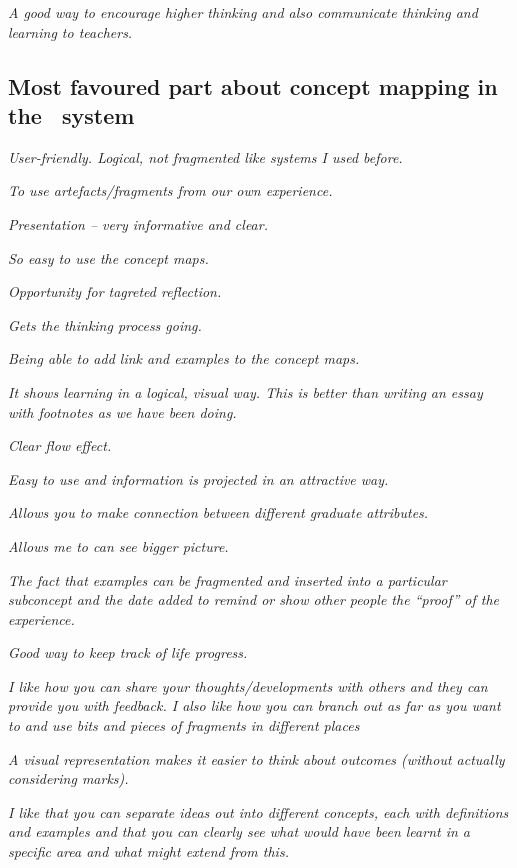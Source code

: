 \textit{A good way to encourage higher thinking and also communicate thinking
and learning to teachers.}


\subsection{Most favoured part about concept mapping in the \ep~system}

\textit{User-friendly. Logical, not fragmented like systems I used before.}

\textit{To use artefacts/fragments from our own experience.}

\textit{Presentation -- very informative and clear.}

\textit{So easy to use the concept maps.}

\textit{Opportunity for tagreted reflection.}

\textit{Gets the thinking process going.}

\textit{Being able to add link and examples to the concept maps.}

\textit{It shows learning in a logical, visual way. This is better than writing
an essay with footnotes as we have been doing.}

\textit{Clear flow effect.}

\textit{Easy to use and information is projected in an attractive way.}

\textit{Allows you to make connection between different graduate attributes.}

\textit{Allows me to can see bigger picture.}

\textit{The fact that examples can be fragmented and inserted into a particular
subconcept and the date added to remind or show other people the ``proof'' of the
experience.}

\textit{Good way to keep track of life progress.}

\textit{I like how you can share your thoughts/developments with others and they
can provide you with feedback. I also like how you can branch out as far as you
want to and use bits and pieces of fragments in different places}

\textit{A visual representation makes it easier to think about outcomes (without
actually considering marks).}

\textit{I like that you can separate ideas out into different concepts, each
with definitions and examples and that you can clearly see what would have been
learnt in a specific area and what might extend from this.}


